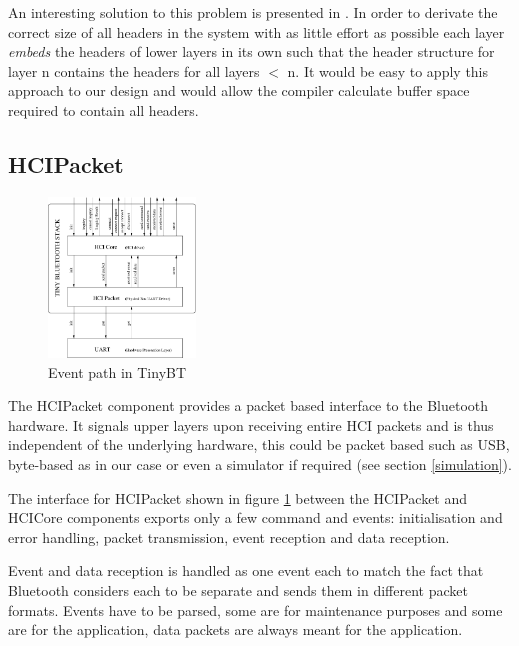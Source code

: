 \documentclass[a4paper,10pt]{article}
\begin{document}
An interesting solution to this problem is presented in \cite{Ye02b}.
In order to derivate the correct size of all headers in the system
with as little effort as possible each layer \emph{embeds} the headers
of lower layers in its own such that the header structure for layer n
contains the headers for all layers $<$ n. It would be easy to apply
this approach to our design and would allow the compiler calculate
buffer space required to contain all headers.

\subsection{HCIPacket}
\label{hcipacket}

\begin{figure}[ptb]
  \begin{center}
    \includegraphics[width=0.35\textwidth]{tinybluetooth} 
    \caption{Event path in TinyBT}
    \label{fig:tinybtcomponent}
  \end{center}
\end{figure}

The HCIPacket component provides a packet based interface to the
Bluetooth hardware. It signals upper layers upon receiving entire HCI
packets and is thus independent of the underlying hardware, this could
be packet based such as USB, byte-based as in our case or even a
simulator if required (see section \ref{simulation}).

The interface for HCIPacket shown in figure \ref{fig:tinybtcomponent}
between the HCIPacket and HCICore components exports only a few command
and events: initialisation and error handling, packet transmission,
event reception and data reception. 

Event and data reception is handled as one event each to match the
fact that Bluetooth considers each to be separate and sends them in
different packet formats. Events have to be parsed, some are for
maintenance purposes and some are for the application, data packets are
always meant for the application.
\end{document}
